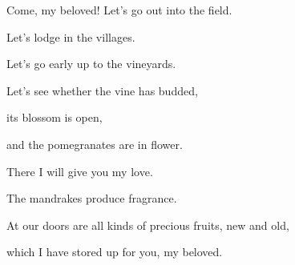 {\par }{\Q {}Come, my beloved! Let’s go out into the field.
\par }{\QB Let’s lodge in the villages.
\par }{\Q {}Let’s go early up to the vineyards.
\par }{\QB Let’s see whether the vine has budded,
\par }{\QB its blossom is open,
\par }{\QB and the pomegranates are in flower.
\par }{\QB There I will give you my love.
\par }{\Q {}The mandrakes produce fragrance.
\par }{\QB At our doors are all kinds of precious fruits, new and old,
\par }{\QB which I have stored up for you, my beloved.

}
